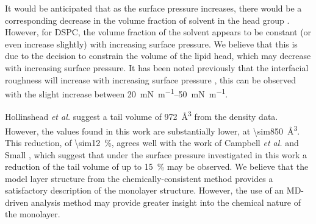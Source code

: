 It would be anticipated that as the surface pressure increases, there would be a corresponding decrease in the volume fraction of solvent in the head group \cite{bayerl_specular_1990}.
However, for DSPC, the volume fraction of the solvent appears to be constant (or even increase slightly) with increasing surface pressure.
We believe that this is due to the decision to constrain the volume of the lipid head, which may decrease with increasing surface pressure.
It has been noted previously that the interfacial roughness will increase with increasing surface pressure \cite{lu_aspects_1994}, this can be observed with the slight increase between \SIrange{20}{50}{\milli\newton\per\meter}.

Hollinshead \emph{et al.} \cite{hollinshead_effects_2009} suggest a tail volume of \SI{972}{\angstrom\cubed} from the density data.
However, the values found in this work are substantially lower, at \SI{\sim850}{\angstrom\cubed}.
This reduction, of \SI{\sim12}{\percent}, agrees well with the work of Campbell \emph{et al.} \cite{campbell_structure_2018} and Small \cite{small_lateral_1984}, which suggest that under the surface pressure investigated in this work a reduction of the tail volume of up to \SI{15}{\percent} may be observed.
We believe that the model layer structure from the chemically-consistent method provides a satisfactory description of the monolayer structure.
However, the use of an MD-driven analysis method may provide greater insight into the chemical nature of the monolayer.

